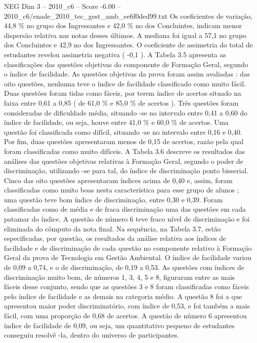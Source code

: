 \begin{textsample}{NEG Dim 3 – 2010\_c6 – Score -6.00 – 2010\_c6/enade\_2010\_tec\_gest\_amb\_ee6f0ded99.txt}
Os coeficientes de variação, 44,8 \% no grupo dos Ingressantes e 42,0 \% no dos Concluintes, indicam menor dispersão relativa nas notas desses últimos.
A mediana foi igual a 57,1 no grupo dos Concluintes e 42,9 no dos Ingressantes.
O coeficiente de assimetria do total de estudantes revelou assimetria negativa ( -0,1 ).
A Tabela 3.5 apresenta as classificações das questões objetivas do componente de Formação Geral, segundo o índice de facilidade.
As questões objetivas da prova foram assim avaliadas : das oito questões, nenhuma teve o índice de facilidade classificado como muito fácil.
Duas questões foram tidas como fáceis, por terem índice de acertos situado na faixa entre 0,61 a 0,85 ( de 61,0 \% e 85,0 \% de acertos ).
Três questões foram consideradas de dificuldade média, situando -se no intervalo entre 0,41 a 0,60 do índice de facilidade, ou seja, houve entre 41,0 \% e 60,0 \% de acertos.
Uma questão foi classificada como difícil, situando -se no intervalo entre 0,16 e 0,40.
Por fim, duas questões apresentaram menos de 0,15 de acertos, razão pela qual foram classificadas como muito difíceis.
A Tabela 3.6 descreve os resultados das análises das questões objetivas relativas à Formação Geral, segundo o poder de discriminação, utilizando -se para tal, do índice de discriminação ponto bisserial.
Cinco das oito questões apresentaram índices acima de 0,40 e, assim, foram classificadas como muito boas nesta característica para esse grupo de alunos ; uma questão teve bom índice de discriminação, entre 0,30 e 0,39.
Foram classificadas como de média e de fraca discriminação uma das questões em cada patamar do índice.
A questão de número 6 teve fraco nível de discriminação e foi eliminada do cômputo da nota final.
Na sequência, na Tabela 3.7, estão especificadas, por questão, os resultados da análise relativa aos índices de facilidade e de discriminação de cada questão no componente relativo à Formação Geral da prova de Tecnologia em Gestão Ambiental.
O índice de facilidade variou de 0,09 a 0,74, e o de discriminação, de 0,19 a 0,53.
As questões com índices de discriminação muito bom, de números 1, 3, 4, 5 e 8, figuraram entre as mais fáceis desse conjunto, sendo que as questões 3 e 8 foram classificadas como fáceis pelo índice de facilidade e as demais na categoria médio.
A questão 8 foi a que apresentou maior poder discriminatório, com índice de 0,53, e foi também a mais fácil, com uma proporção de 0,68 de acertos.
A questão de número 6 apresentou índice de facilidade de 0,09, ou seja, um quantitativo pequeno de estudantes conseguiu resolvê -la, dentro do universo de participantes.

\end{textsample}
